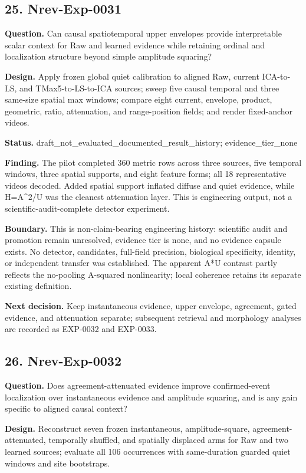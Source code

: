 \subsection{25. Nrev-Exp-0031}

\textbf{Question.} Can causal spatiotemporal upper envelopes provide interpretable scalar context for Raw and learned evidence while retaining ordinal and localization structure beyond simple amplitude squaring?

\textbf{Design.} Apply frozen global quiet calibration to aligned Raw, current ICA-to-LS, and TMax5-to-LS-to-ICA sources; sweep five causal temporal and three same-size spatial max windows; compare eight current, envelope, product, geometric, ratio, attenuation, and range-position fields; and render fixed-anchor videos.

\textbf{Status.} draft\_not\_evaluated\_documented\_result\_history; evidence\_tier\_none

\textbf{Finding.} The pilot completed 360 metric rows across three sources, five temporal windows, three spatial supports, and eight feature forms; all 18 representative videos decoded. Added spatial support inflated diffuse and quiet evidence, while H=A^2/U was the cleanest attenuation layer. This is engineering output, not a scientific-audit-complete detector experiment.

\textbf{Boundary.} This is non-claim-bearing engineering history: scientific audit and promotion remain unresolved, evidence tier is none, and no evidence capsule exists. No detector, candidates, full-field precision, biological specificity, identity, or independent transfer was established. The apparent A*U contrast partly reflects the no-pooling A-squared nonlinearity; local coherence retains its separate existing definition.

\textbf{Next decision.} Keep instantaneous evidence, upper envelope, agreement, gated evidence, and attenuation separate; subsequent retrieval and morphology analyses are recorded as EXP-0032 and EXP-0033.

\subsection{26. Nrev-Exp-0032}

\textbf{Question.} Does agreement-attenuated evidence improve confirmed-event localization over instantaneous evidence and amplitude squaring, and is any gain specific to aligned causal context?

\textbf{Design.} Reconstruct seven frozen instantaneous, amplitude-square, agreement-attenuated, temporally shuffled, and spatially displaced arms for Raw and two learned sources; evaluate all 106 occurrences with same-duration guarded quiet windows and site bootstraps.

